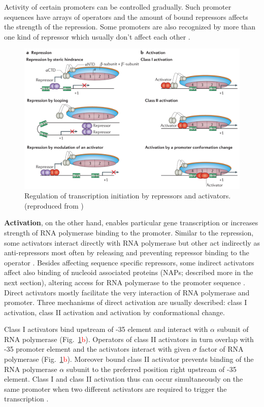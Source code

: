 Activity of certain promoters can be controlled gradually.
Such promoter sequences have arrays of operators and the amount of bound repressors affects the strength of the repression.
Some promoters are also recognized by more than one kind of repressor which usually don't affect each other \cite{el2009repression}.

\begin{figure}[ht!]
  \centering
  \includegraphics[scale=0.4]{text/Pictures/TxnInitRegulation.png}
	\caption{Regulation of transcription initiation by repressors and activators. (reproduced from \cite{browning2016local})}
	\label{txn}
\end{figure}

\textbf{Activation}, on the other hand, enables particular gene transcription or increases strength of RNA polymerase binding to the promoter.
Similar to the repression, some activators interact directly with RNA polymerase but other act indirectly as anti-repressors most often by releasing and preventing repressor binding to the operator \cite{frederix2011co}.
Besides affecting sequence specific repressors, some indirect activators affect also binding of nucleoid associated proteins (NAPs; described more in the next section), altering access for RNA polymerase to the promoter sequence \cite{santana2001transcriptional}.
Direct activators mostly facilitate the very interaction of RNA polymerase and promoter.
Three mechanisms of direct activation are usually described: class I activation, class II activation and activation by conformational change.

Class I activators bind upstream of -35 element and interact with $\alpha$ subunit of RNA polymerase \cite{ushida1990helical} (Fig.~\ref{txn}\textcolor{red}{b}).
Operators of class II activators in turn overlap with -35 promoter element and the activators interact with given $\sigma$ factor of RNA polymerase \cite{igarashi1991functional} (Fig.~\ref{txn}\textcolor{red}{b}).
Moreover bound class II activator prevents binding of the RNA polymerase $\alpha$ subunit to the preferred position right upstream of -35 element.
Class I and class II activation thus can occur simultaneously on the same promoter when two different activators are required to trigger the transcription \cite{lloyd2002requirement}.

